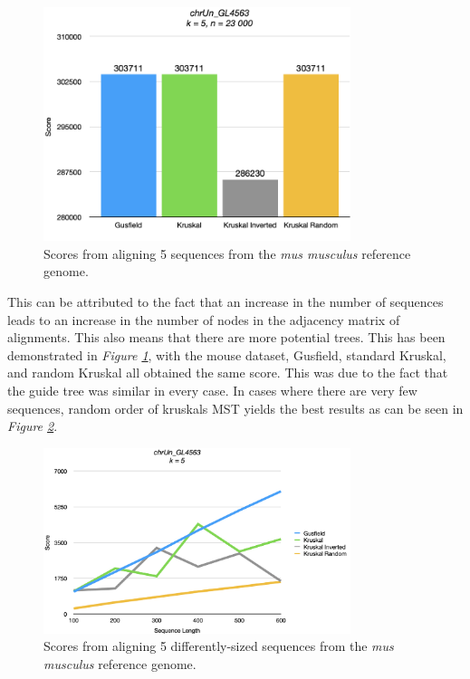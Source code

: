 \documentclass[twoside,openright,titlepage,numbers=noenddot,headinclude,%
                footinclude=true,cleardoublepage=empty,abstractoff, %
                BCOR=5mm,paper=a4,fontsize=11pt,%
                ngerman,american,%
                ]{scrreprt}
\begin{document}
\begin{figure}[H]
\includegraphics[width=0.8\textwidth]{chart-5.png}
\centering
\caption{Scores from aligning 5 sequences from the \textit{mus musculus} reference genome.}
\label{fig:chart-5}
\end{figure}

This can be attributed to the fact that an increase in the number of sequences leads to an increase in the number of nodes in the adjacency matrix of alignments. This also means that there are more potential trees. This has been demonstrated in \textit{Figure \ref{fig:chart-5}}, with the mouse dataset, Gusfield, standard Kruskal, and random Kruskal all obtained the same score. This was due to the fact that the guide tree was similar in every case. In cases where there are very few sequences, random order of kruskals MST yields the best results as can be seen in \textit{Figure \ref{fig:chart-1}}.


\begin{figure}[H]
\includegraphics[width=0.8\textwidth]{chart-1.png}
\centering
\caption{Scores from aligning 5 differently-sized sequences from the \textit{mus musculus} reference genome.}
\label{fig:chart-1}
\end{figure}
\end{document}

